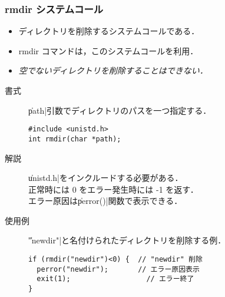\documentclass{beamer}                 %
\begin{document}
\begin{frame}[fragile]
  \frametitle{rmdir システムコール}
  \begin{itemize}
  \item ディレクトリを削除するシステムコールである．
  \item rmdir コマンドは，このシステムコールを利用．
  \item \emph{空でないディレクトリを削除することはできない．}
  \end{itemize}

  \begin{description}
  \item[書式] \|path|引数でディレクトリのパスを一つ指定する．
\begin{verbatim}
#include <unistd.h>
int rmdir(char *path);
\end{verbatim}

  \item[解説] \|unistd.h|をインクルードする必要がある．\\
    正常時には 0 をエラー発生時には -1 を返す．\\
    エラー原因は\|perror()|関数で表示できる．

  \item[使用例] \|"newdir"|と名付けられたディレクトリを削除する例．
\begin{verbatim}
if (rmdir("newdir")<0) {  // "newdir" 削除
  perror("newdir");       // エラー原因表示
  exit(1);                  // エラー終了
}
\end{verbatim}
  \end{description}
\end{frame}
\end{document}

